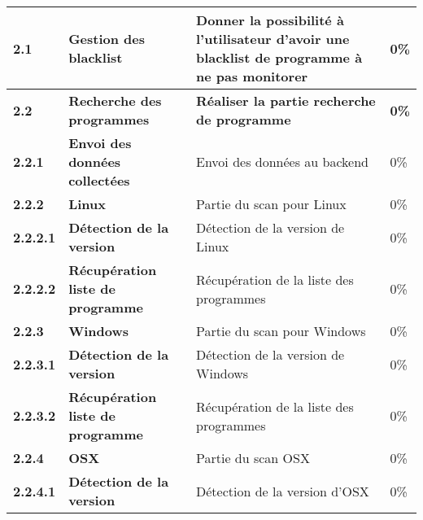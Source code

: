 \begin{supertabular}{|p{2.8cm} p{6cm}|p{5cm}|R{2cm}|}
  \textbf{2.1}  & \textbf{Gestion des blacklist} & \textbf{Donner la possibilité à l'utilisateur d'avoir une blacklist de programme à ne pas monitorer} & \textbf{0\%} \\
  \hline

  \textbf{2.2}  & \textbf{Recherche des programmes} & \textbf{Réaliser la partie recherche de programme} & \textbf{0\%} \\
  \hline


  \hspace{6pt}
  \textbf{2.2.1}  & \textbf{Envoi des données collectées} & Envoi des données au backend & 0\% \\
  \hline


  \hspace{6pt}
  \textbf{2.2.2}  & \textbf{Linux} & Partie du scan pour Linux & 0\% \\
  \hline

  \hspace{12pt}
  \textbf{2.2.2.1}  & \textbf{Détection de la version} & Détection de la version de Linux & 0\% \\
  \hline

  \hspace{12pt}
  \textbf{2.2.2.2}  & \textbf{Récupération liste de programme} & Récupération de la liste des programmes & 0\% \\
  \hline

  \hspace{6pt}
  \textbf{2.2.3}  & \textbf{Windows} & Partie du scan pour Windows & 0\% \\
  \hline

  \hspace{12pt}
  \textbf{2.2.3.1}  & \textbf{Détection de la version} & Détection de la version de Windows & 0\% \\
  \hline

  \hspace{12pt}
  \textbf{2.2.3.2}  & \textbf{Récupération liste de programme} & Récupération de la liste des programmes & 0\% \\
  \hline

  \hspace{6pt}
  \textbf{2.2.4}  & \textbf{OSX} & Partie du scan OSX & 0\% \\
  \hline

  \hspace{12pt}
  \textbf{2.2.4.1}  & \textbf{Détection de la version} & Détection de la version d'OSX & 0\% \\
  \hline


\end{supertabular}
